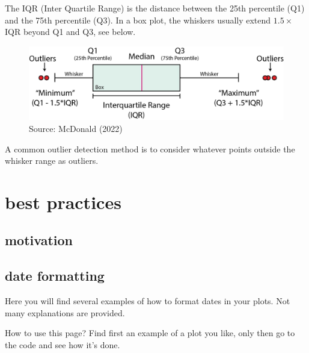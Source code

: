 \documentclass[
  letterpaper,
  DIV=11,
  numbers=noendperiod,
  oneside]{scrreprt}
\begin{document}
The IQR (Inter Quartile Range) is the distance between the 25th
percentile (Q1) and the 75th percentile (Q3). In a box plot, the
whiskers usually extend \(1.5\times\)IQR beyond Q1 and Q3, see below.

\begin{figure}

{\centering \includegraphics{outliers/iqr1.png}

}

\caption{Source: McDonald (2022)}

\end{figure}

A common outlier detection method is to consider whatever points outside
the whisker range as outliers.

\part{best practices}

\hypertarget{motivation-3}{%
\chapter{motivation}\label{motivation-3}}

\hypertarget{date-formatting}{%
\chapter{date formatting}\label{date-formatting}}

Here you will find several examples of how to format dates in your
plots. Not many explanations are provided.

How to use this page? Find first an example of a plot you like, only
then go to the code and see how it's done.
\end{document}
